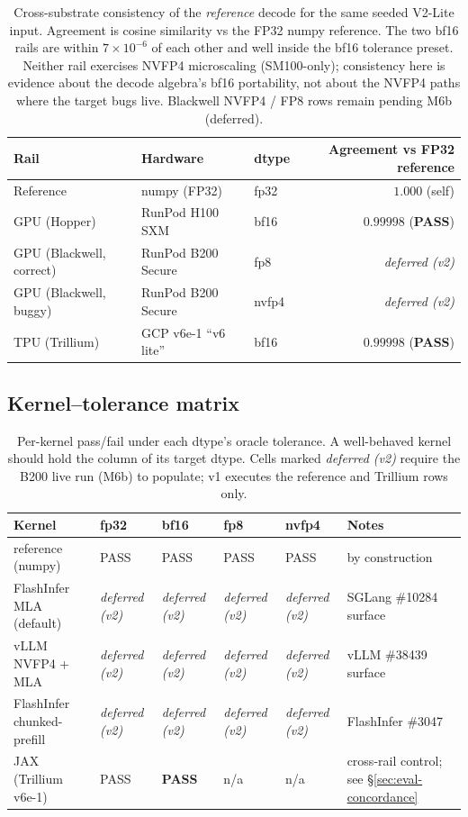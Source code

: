 \documentclass[11pt]{article}
\begin{document}
\begin{table}[htbp]
\centering
\caption{Cross-substrate consistency of the \emph{reference} decode for
the same seeded V2-Lite input. Agreement is cosine similarity vs the
FP32 numpy reference. The two bf16 rails are within $7\times 10^{-6}$
of each other and well inside the bf16 tolerance preset. Neither rail
exercises NVFP4 microscaling (SM100-only); consistency here is evidence
about the decode algebra's bf16 portability, not about the NVFP4 paths
where the target bugs live. Blackwell NVFP4 / FP8 rows remain pending
M6b (deferred).}
\label{tab:concordance}
\begin{tabular}{lllr}
\toprule
Rail & Hardware & dtype & Agreement vs FP32 reference \\
\midrule
Reference    & numpy (FP32)     & fp32 & $1.000$ (self) \\
GPU (Hopper) & RunPod H100 SXM  & bf16 & $0.99998$ (\textbf{PASS}) \\
GPU (Blackwell, correct) & RunPod B200 Secure & fp8 & \textit{deferred (v2)} \\
GPU (Blackwell, buggy)   & RunPod B200 Secure & nvfp4 & \textit{deferred (v2)} \\
TPU (Trillium) & GCP v6e-1 ``v6 lite'' & bf16 & $0.99998$ (\textbf{PASS}) \\
\bottomrule
\end{tabular}
\end{table}

\subsection{Kernel--tolerance matrix}
\label{sec:eval-matrix}

\begin{table}[htbp]
\centering
\caption{Per-kernel pass/fail under each dtype's oracle tolerance. A
well-behaved kernel should hold the column of its target dtype. Cells
marked \textit{deferred (v2)} require the B200 live run (M6b) to
populate; v1 executes the reference and Trillium rows only.}
\label{tab:matrix}
\begin{tabular}{llllll}
\toprule
Kernel & fp32 & bf16 & fp8 & nvfp4 & Notes \\
\midrule
reference (numpy)       & PASS & PASS & PASS & PASS & by construction \\
FlashInfer MLA (default) & \textit{deferred (v2)} & \textit{deferred (v2)} & \textit{deferred (v2)} & \textit{deferred (v2)} & SGLang \#10284 surface \\
vLLM NVFP4 + MLA         & \textit{deferred (v2)} & \textit{deferred (v2)} & \textit{deferred (v2)} & \textit{deferred (v2)} & vLLM \#38439 surface \\
FlashInfer chunked-prefill & \textit{deferred (v2)} & \textit{deferred (v2)} & \textit{deferred (v2)} & \textit{deferred (v2)} & FlashInfer \#3047 \\
JAX (Trillium v6e-1)     & PASS & \textbf{PASS} & n/a & n/a & cross-rail control; see \S\ref{sec:eval-concordance} \\
\bottomrule
\end{tabular}
\end{table}
\end{document}
